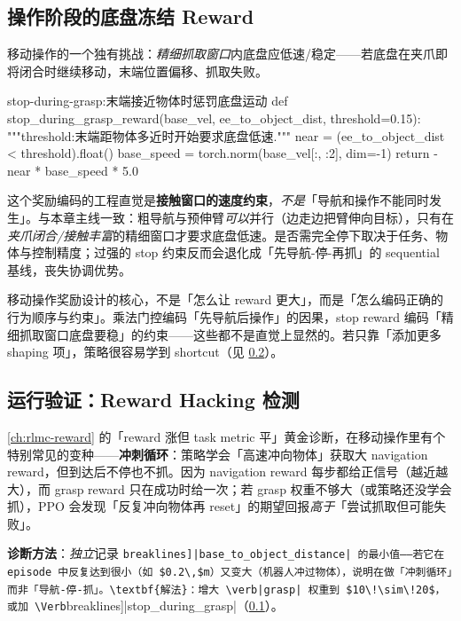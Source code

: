 \subsection{操作阶段的底盘冻结 Reward}
\label{sec:rlmc-lm-reward-stop}

移动操作的一个独有挑战：\emph{精细抓取窗口}内底盘应低速/稳定——若底盘在夹爪即将闭合时继续移动，末端位置偏移、抓取失败。

\begin{codebox}[Python]{stop-during-grasp:末端接近物体时惩罚底盘运动}
def stop_during_grasp_reward(base_vel, ee_to_object_dist, threshold=0.15):
    """threshold:末端距物体多近时开始要求底盘低速."""
    near = (ee_to_object_dist < threshold).float()
    base_speed = torch.norm(base_vel[:, :2], dim=-1)
    return -near * base_speed * 5.0
\end{codebox}

这个奖励编码的工程直觉是\textbf{接触窗口的速度约束}，\emph{不是}「导航和操作不能同时发生」。与本章主线一致：粗导航与预伸臂\emph{可以}并行（边走边把臂伸向目标），只有在\emph{夹爪闭合/接触丰富}的精细窗口才要求底盘低速。是否需完全停下取决于任务、物体与控制精度；过强的 stop 约束反而会退化成「先导航-停-再抓」的 sequential 基线，丧失协调优势。

\begin{insight}\label{ins:rlmc-lm-reward-order}
移动操作奖励设计的核心，不是「怎么让 reward 更大」，而是「怎么编码正确的行为顺序与约束」。乘法门控编码「先导航后操作」的因果，stop reward 编码「精细抓取窗口底盘要稳」的约束——这些都不是直觉上显然的。若只靠「添加更多 shaping 项」，策略很容易学到 shortcut（见 \cref{sec:rlmc-lm-reward-hack}）。
\end{insight}

\subsection{运行验证：Reward Hacking 检测}
\label{sec:rlmc-lm-reward-hack}

\cref{ch:rlmc-reward} 的「reward 涨但 task metric 平」黄金诊断，在移动操作里有个特别常见的变种——\textbf{冲刺循环}：策略学会「高速冲向物体」获取大 navigation reward，但到达后不停也不抓。因为 navigation reward 每步都给正信号（越近越大），而 grasp reward 只在成功时给一次；若 grasp 权重不够大（或策略还没学会抓），PPO 会发现「反复冲向物体再 reset」的期望回报\emph{高于}「尝试抓取但可能失败」。

\textbf{诊断方法}：\emph{独立}记录 \Verb[breaklines]|base_to_object_distance| 的最小值——若它在 episode 中反复达到很小（如 $0.2\,$m）又变大（机器人冲过物体），说明在做「冲刺循环」而非「导航-停-抓」。\textbf{解法}：增大 \verb|grasp| 权重到 $10\!\sim\!20$，或加 \Verb[breaklines]|stop_during_grasp|（\cref{sec:rlmc-lm-reward-stop}）。

